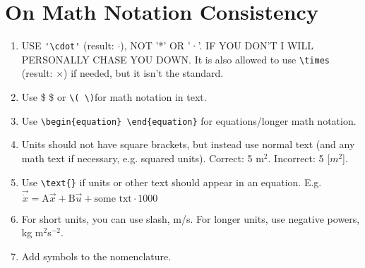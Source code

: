 \section*{On Math Notation Consistency}
\label{sec:math-consistency}
\begin{enumerate}[label=M.\arabic*]
    \item USE \verb|'\cdot'| (result: $\cdot$), NOT '*' OR '·'. IF YOU DON'T I WILL PERSONALLY CHASE YOU DOWN. It is also allowed to use \verb|\times| (result: $\times$) if needed, but it isn't the standard.
    \item Use \$ \$ or \verb|\( \)|for math notation in text.
    \item Use \verb|\begin{equation} \end{equation}| for equations/longer math notation.
    \item Units should not have square brackets, but instead use normal text (and any math text if necessary, e.g. squared units). Correct: 5 m\(^2\). Incorrect: 5 [$m^2$].
    \item Use \verb|\text{}| if units or other text should appear in an equation. E.g. $ \vec{\dot{x}} = \text{A} \vec{x} + \text{B} \vec{u} + \text{some txt} \cdot 1000$
    \item For short units, you can use slash, m/s. For longer units, use negative powers, kg m\(^2\)s\(^{-2}\).
    \item Add symbols to the nomenclature. 
\end{enumerate}

